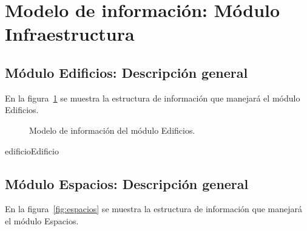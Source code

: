 
%


\section{Modelo de información: Módulo Infraestructura}
\subsection{Módulo Edificios: Descripción general}
En la figura~\ref{fig:edificio} se muestra la estructura de información que manejará el módulo Edificios.

\begin{figure}[htbp!]
	\begin{center}
		\caption{Modelo de información del módulo Edificios.}
		\label{fig:edificio}
	\end{center}
\end{figure}

\begin{BusinessEntity}{edificio}{Edificio}
	
	
	
\end{BusinessEntity}

\subsection{Módulo Espacios: Descripción general}
En la figura~\ref{fig:espacios} se muestra la estructura de información que manejará el módulo Espacios.

